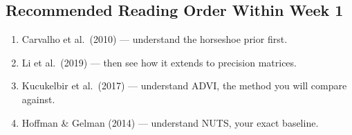 \documentclass[11pt,a4paper]{article}
\begin{document}
\subsection*{Recommended Reading Order Within Week 1}

\begin{enumerate}[nosep]
  \item Carvalho et al.\ (2010) --- understand the horseshoe prior first.
  \item Li et al.\ (2019) --- then see how it extends to precision matrices.
  \item Kucukelbir et al.\ (2017) --- understand ADVI, the method you will compare against.
  \item Hoffman \& Gelman (2014) --- understand NUTS, your exact baseline.
\end{enumerate}
\end{document}
